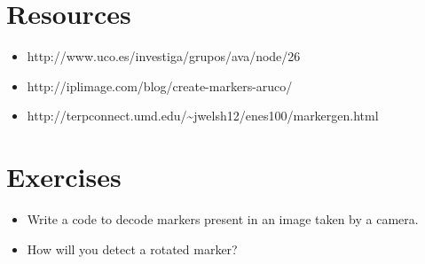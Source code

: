 \documentclass[]{article}
\providecommand{\tightlist}{%
  \setlength{\itemsep}{0pt}\setlength{\parskip}{0pt}}
\begin{document}
\section{Resources}\label{resources}

\begin{itemize}
\tightlist
\item
  http://www.uco.es/investiga/grupos/ava/node/26
\item
  http://iplimage.com/blog/create-markers-aruco/
\item
  http://terpconnect.umd.edu/\textasciitilde{}jwelsh12/enes100/markergen.html
\end{itemize}

\section{Exercises}\label{exercises}

\begin{itemize}
\tightlist
\item
  Write a code to decode markers present in an image taken by a camera.
\item
  How will you detect a rotated marker?
\end{itemize}
\end{document}
